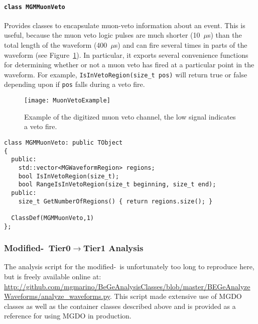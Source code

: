				\paragraph{\lstinline!class MGMMuonVeto!}
Provides classes to encapsulate muon-veto information about an event.  This is useful, because the muon veto logic pulses are much shorter (10~$\mu$s) than the total length of the waveform (400~$\mu$s) and can fire several times in parts of the waveform (see Figure~\ref{fig:MuonVetoExample}).  In particular, it exports several convenience functions
for determining whether or not a muon veto has fired at a particular point in the waveform.  For example, \lstinline!IsInVetoRegion(size_t pos)! will return true or false depending upon if \lstinline!pos! falls during a veto fire.
					\begin{figure}
						\centering
						\texttt{[image: MuonVetoExample]}
						\caption[Example of the digitized muon veto channel.]
						{Example of the digitized muon veto channel, the low signal indicates a veto fire.}
						\label{fig:MuonVetoExample}
					\end{figure}
					\begin{lstlisting}
class MGMMuonVeto: public TObject
{
  public:
    std::vector<MGWaveformRegion> regions;
    bool IsInVetoRegion(size_t);
    bool RangeIsInVetoRegion(size_t beginning, size_t end);
  public:
    size_t GetNumberOfRegions() { return regions.size(); }
    
  ClassDef(MGMMuonVeto,1)
};
					\end{lstlisting}		
			\subsubsection{Modified-\bege~Tier0\texorpdfstring{$\to$}{ to }Tier1 Analysis}	
The analysis script for the modified-\bege~is unfortunately too long to reproduce here, but is freely available online at:
\url{http://github.com/mgmarino/BeGeAnalysisClasses/blob/master/BEGeAnalyzeWaveforms/analyze_waveforms.py}.  This 
script made extensive use of MGDO classes as well as the container classes described above and is provided as a reference
for using MGDO in production.
					
